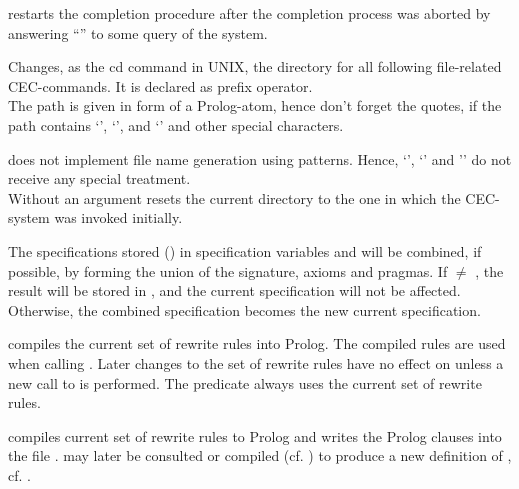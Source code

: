 \begin{command}[cResume]
restarts the completion procedure after the completion process was 
aborted by answering ``'' to some query of the system.
\end{command}

\begin{command}
Changes, as the cd command in UNIX, the directory for all following
file-related CEC-commands. It is declared as prefix operator.\\
The path is given in form of a Prolog-atom, hence don't forget the
quotes, if the path contains `\kw{/}', `', and `' and 
other special characters.

 does not implement file name generation using patterns.
Hence, `\kw{*}', `' and '\kw{[}' do not receive any special treatment.\\
Without an argument  resets the current directory to the one in
which the CEC-system was invoked initially.
\end{command}


\begin{command}
The specifications  stored ( {}) 
in specification variables  and 
will  be combined, if possible, by forming
the union of the signature, axioms and pragmas.
If  $\neq$ , the result will be stored in
, and the current specification will not be affected.
Otherwise, the combined specification becomes the new current
specification.
\end{command}

\begin{command}
compiles the current set of rewrite rules into  Prolog.
The compiled rules are used when calling . 
Later changes to the set of rewrite rules
have no effect on  unless a new call to  is
performed. The predicate  always uses the current set of
rewrite rules.
\end{command}
 
\begin{command}
compiles current set of rewrite rules to Prolog and writes the Prolog clauses into
the file .  may later be consulted or compiled 
(cf. ) to produce a new definition of , cf. .
\end{command}
 

